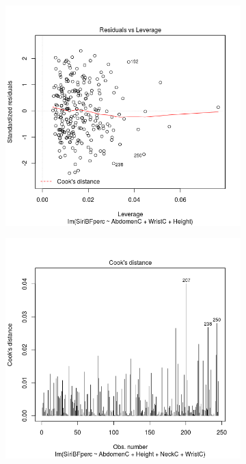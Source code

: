 \documentclass[a4paper, 11pt]{article}
\begin{document}
\begin{figure}[H]
\begin{subfigure}[t]{.5\textwidth}
  \end{subfigure}
  \begin{subfigure}[t]{.5\textwidth}
    \centering
    \includegraphics[width=\linewidth]{fwd_leverage.png}
  \end{subfigure}
  \hfill
  \begin{subfigure}[t]{.5\textwidth}
    \centering
    \includegraphics[width=\linewidth]{fwd_cooks.png}
  \end{subfigure}
\end{figure}
\end{document}
